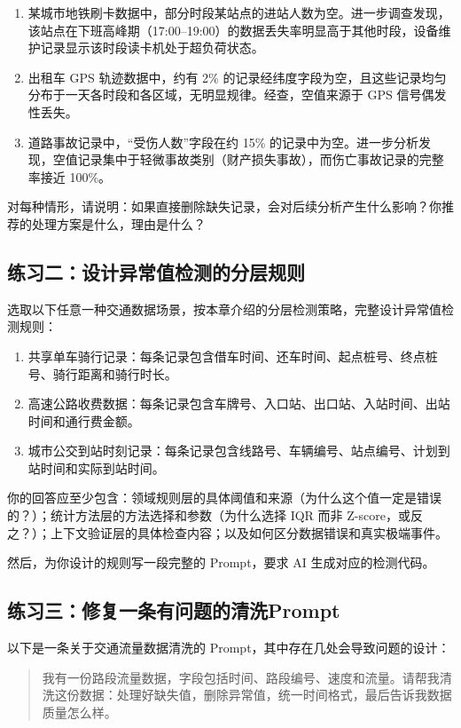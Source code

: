 \begin{enumerate}
  \item 某城市地铁刷卡数据中，部分时段某站点的进站人数为空。进一步调查发现，该站点在下班高峰期（17:00--19:00）的数据丢失率明显高于其他时段，设备维护记录显示该时段读卡机处于超负荷状态。
  \item 出租车 GPS 轨迹数据中，约有 2\% 的记录经纬度字段为空，且这些记录均匀分布于一天各时段和各区域，无明显规律。经查，空值来源于 GPS 信号偶发性丢失。
  \item 道路事故记录中，“受伤人数”字段在约 15\% 的记录中为空。进一步分析发现，空值记录集中于轻微事故类别（财产损失事故），而伤亡事故记录的完整率接近 100\%。
\end{enumerate}

对每种情形，请说明：如果直接删除缺失记录，会对后续分析产生什么影响？你推荐的处理方案是什么，理由是什么？

\subsection*{练习二：设计异常值检测的分层规则}

选取以下任意一种交通数据场景，按本章介绍的分层检测策略，完整设计异常值检测规则：

\begin{enumerate}
  \item 共享单车骑行记录：每条记录包含借车时间、还车时间、起点桩号、终点桩号、骑行距离和骑行时长。
  \item 高速公路收费数据：每条记录包含车牌号、入口站、出口站、入站时间、出站时间和通行费金额。
  \item 城市公交到站时刻记录：每条记录包含线路号、车辆编号、站点编号、计划到站时间和实际到站时间。
\end{enumerate}

你的回答应至少包含：领域规则层的具体阈值和来源（为什么这个值一定是错误的？）；统计方法层的方法选择和参数（为什么选择 IQR 而非 Z-score，或反之？）；上下文验证层的具体检查内容；以及如何区分数据错误和真实极端事件。

然后，为你设计的规则写一段完整的 Prompt，要求 AI 生成对应的检测代码。

\subsection*{练习三：修复一条有问题的清洗Prompt}

以下是一条关于交通流量数据清洗的 Prompt，其中存在几处会导致问题的设计：

\begin{quote}
我有一份路段流量数据，字段包括时间、路段编号、速度和流量。请帮我清洗这份数据：处理好缺失值，删除异常值，统一时间格式，最后告诉我数据质量怎么样。
\end{quote}

